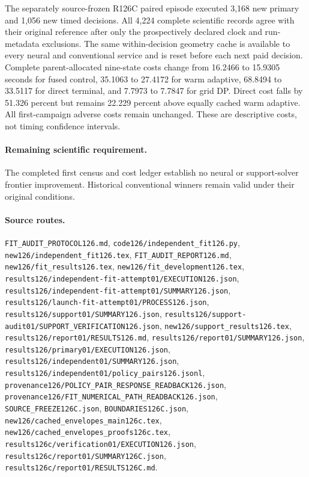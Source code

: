 The separately source-frozen R126C paired episode executed 3,168 new primary and 1,056 new timed decisions. All 4,224 complete scientific records agree with their original reference after only the prospectively declared clock and run-metadata exclusions. The same within-decision geometry cache is available to every neural and conventional service and is reset before each next paid decision. Complete parent-allocated nine-state costs change from 16.2466 to 15.9305 seconds for fused control, 35.1063 to 27.4172 for warm adaptive, 68.8494 to 33.5117 for direct terminal, and 7.7973 to 7.7847 for grid DP. Direct cost falls by 51.326 percent but remains 22.229 percent above equally cached warm adaptive. All first-campaign adverse costs remain unchanged. These are descriptive costs, not timing confidence intervals.\par

\paragraph{Remaining scientific requirement.} The completed first census and cost ledger establish no neural or support-solver frontier improvement. Historical conventional winners remain valid under their original conditions.

\paragraph{Source routes.} \nolinkurl{FIT_AUDIT_PROTOCOL126.md}, \nolinkurl{code126/independent_fit126.py}, \nolinkurl{new126/independent_fit126.tex}, \nolinkurl{FIT_AUDIT_REPORT126.md}, \nolinkurl{new126/fit_results126.tex}, \nolinkurl{new126/fit_development126.tex}, \nolinkurl{results126/independent-fit-attempt01/EXECUTION126.json}, \nolinkurl{results126/independent-fit-attempt01/SUMMARY126.json}, \nolinkurl{results126/launch-fit-attempt01/PROCESS126.json}, \nolinkurl{results126/support01/SUMMARY126.json}, \nolinkurl{results126/support-audit01/SUPPORT_VERIFICATION126.json}, \nolinkurl{new126/support_results126.tex}, \nolinkurl{results126/report01/RESULTS126.md}, \nolinkurl{results126/report01/SUMMARY126.json}, \nolinkurl{results126/primary01/EXECUTION126.json}, \nolinkurl{results126/independent01/SUMMARY126.json}, \nolinkurl{results126/independent01/policy_pairs126.jsonl}, \nolinkurl{provenance126/POLICY_PAIR_RESPONSE_READBACK126.json}, \nolinkurl{provenance126/FIT_NUMERICAL_PATH_READBACK126.json}, \nolinkurl{SOURCE_FREEZE126C.json}, \nolinkurl{BOUNDARIES126C.json}, \nolinkurl{new126/cached_envelopes_main126c.tex}, \nolinkurl{new126/cached_envelopes_proofs126c.tex}, \nolinkurl{results126c/verification01/EXECUTION126.json}, \nolinkurl{results126c/report01/SUMMARY126C.json}, \nolinkurl{results126c/report01/RESULTS126C.md}.

